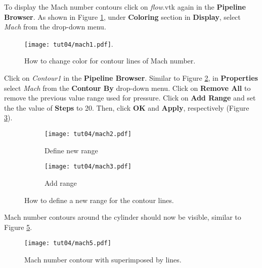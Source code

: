 To display the Mach number contours click on \textit{flow}.vtk again in the \textbf{Pipeline Browser}. As shown in Figure \ref{fig4:mach1_4}, under \textbf{Coloring} section in \textbf{Display}, select \textit{Mach} from the drop-down menu.
\begin{figure}[htbp]
    \centering
    \texttt{[image: tut04/mach1.pdf]}.
    \caption{How to change color for contour lines of Mach number.}
    \label{fig4:mach1_4}
\end{figure}
Click on \textit{Contour1} in the \textbf{Pipeline Browser}. Similar to Figure \ref{fig4:mach2_4 a}, in \textbf{Properties} select \textit{Mach} from the \textbf{Contour By} drop-down menu. Click on \textbf{Remove All} to remove the previous value range used for pressure. Click on \textbf{Add Range} and set the the value of \textbf{Steps} to 20. Then, click \textbf{OK} and \textbf{Apply}, respectively (Figure \ref{fig4:mach2_4 b}).
\begin{figure}[htbp]
    \centering
    \begin{subfigure}[b]{0.4\textwidth}
        \centering
        \texttt{[image: tut04/mach2.pdf]}
        \caption{Define new range}
        \label{fig4:mach2_4 a}
    \end{subfigure}
    \hfill
    \begin{subfigure}[b]{.4\textwidth}
        \centering
        \texttt{[image: tut04/mach3.pdf]}
        \caption{Add range}
        \label{fig4:mach2_4 b}
    \end{subfigure}     
    \caption{How to define a new range for the contour lines.}
    \label{fig4:mach2_4}
\end{figure}
Mach number contours around the cylinder should now be visible, similar to Figure \ref{fig4:mach5_4}.
\begin{figure}[htbp]
    \centering
    \texttt{[image: tut04/mach5.pdf]}
    \caption{Mach number contour with superimposed by lines.}
    \label{fig4:mach5_4}
\end{figure}
